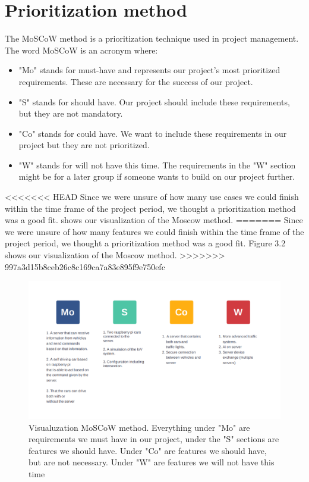 \section{Prioritization method}
The MoSCoW method is a prioritization technique used in project management. The word MoSCoW is an acronym where:

\begin{itemize}
	\item "Mo" stands for must-have and represents our project's most prioritized requirements. These are necessary for the success of our project.
	\item "S" stands for should have. Our project should include these requirements, but they are not mandatory.
	\item "Co" stands for could have. We want to include these requirements in our project but they are not prioritized.
	\item "W" stands for will not have this time. The requirements in the "W" section might be for a later group if someone wants to build on our project further.
\end{itemize}

<<<<<<< HEAD
Since we were unsure of how many use cases we could finish within the time frame of the project period, we thought a prioritization method was a good fit.  shows our visualization of the Moscow method.
=======
Since we were unsure of how many features we could finish within the time frame of the project period, we thought a prioritization method was a good fit. Figure 3.2 shows our visualization of the Moscow method.
>>>>>>> 997a3d15b8ceb26c8c169ca7a83e895f9e750efc

\begin{figure}[h!]
	\centering
	\includegraphics[width=1\linewidth]{figures/MosCoW_method}
	\caption[MosCoW method]{Visualuzation MoSCoW method. Everything under "Mo" are requirements we must have in our project, under the "S" sections are features we should have. Under "Co" are features we should have, but are not necessary. Under "W" are features we will not have this time}
	\label{fig:moscowmethod}
\end{figure}


